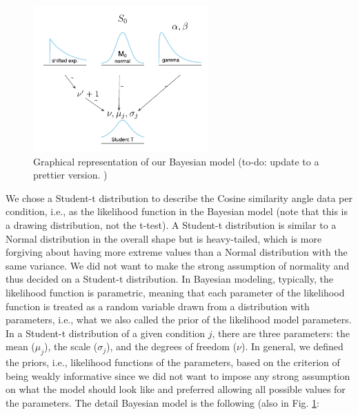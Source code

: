 \begin{figure}[htpb]
    \centering
    \includegraphics[width=0.6\textwidth, keepaspectratio=true]{content/image/model_1_diagram.pdf}
    \caption{
      Graphical representation of our Bayesian model (to-do: update to a prettier version. )
    }
    \label{fig:bayesian_model_exp1}
\end{figure}

We chose a Student-t distribution 
to describe the Cosine similarity angle data per condition, 
i.e., as the likelihood function in the Bayesian model %
(note that this is a drawing distribution, not the t-test). 
A Student-t distribution is similar to a Normal distribution 
in the overall shape but is heavy-tailed, 
which is more forgiving about having more extreme values 
than a Normal distribution with the same variance. 
We did not want to make the strong assumption of normality 
and thus decided on a Student-t distribution. 
In Bayesian modeling, typically, the likelihood function is parametric, 
meaning that each parameter of the likelihood function is treated as a random variable 
drawn from a distribution with parameters, 
i.e., what we also called the prior of the likelihood model parameters. 
In a Student-t distribution of a given condition $j$, 
there are three parameters: 
the mean ($\mu_j$), the scale ($\sigma_j$), and the degrees of freedom ($\nu$). 
In general, we defined the priors, 
i.e., likelihood functions of the parameters, 
based on the criterion of being weakly informative 
since we did not want to impose any strong assumption on what the model should look like 
and preferred allowing all possible values for the parameters. 
The detail Bayesian model is the following (also in Fig. \ref{fig:bayesian_model_exp1}:

